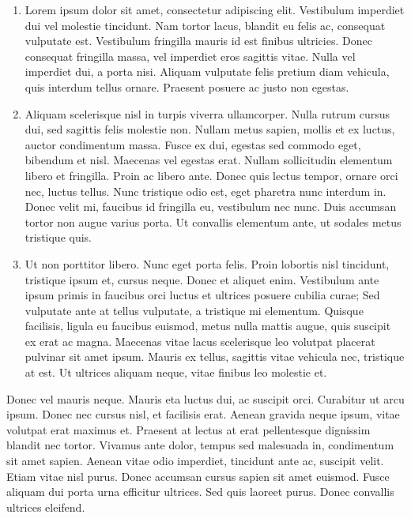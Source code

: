 \documentclass[DoubleHeader, Abgabe]{../abgaben}
\begin{document}
		
	
	\begin{enumerate}
		\item  Lorem ipsum dolor sit amet, consectetur adipiscing elit. Vestibulum imperdiet dui vel molestie tincidunt. Nam tortor lacus, blandit eu felis ac, consequat vulputate est. Vestibulum fringilla mauris id est finibus ultricies. Donec consequat fringilla massa, vel imperdiet eros sagittis vitae. Nulla vel imperdiet dui, a porta nisi. Aliquam vulputate felis pretium diam vehicula, quis interdum tellus ornare. Praesent posuere ac justo non egestas. 
		\item  Aliquam scelerisque nisl in turpis viverra ullamcorper. Nulla rutrum cursus dui, sed sagittis felis molestie non. Nullam metus sapien, mollis et ex luctus, auctor condimentum massa. Fusce ex dui, egestas sed commodo eget, bibendum et nisl. Maecenas vel egestas erat. Nullam sollicitudin elementum libero et fringilla. Proin ac libero ante. Donec quis lectus tempor, ornare orci nec, luctus tellus. Nunc tristique odio est, eget pharetra nunc interdum in. Donec velit mi, faucibus id fringilla eu, vestibulum nec nunc. Duis accumsan tortor non augue varius porta. Ut convallis elementum ante, ut sodales metus tristique quis. 
		\item  Ut non porttitor libero. Nunc eget porta felis. Proin lobortis nisl tincidunt, tristique ipsum et, cursus neque. Donec et aliquet enim. Vestibulum ante ipsum primis in faucibus orci luctus et ultrices posuere cubilia curae; Sed vulputate ante at tellus vulputate, a tristique mi elementum. Quisque facilisis, ligula eu faucibus euismod, metus nulla mattis augue, quis suscipit ex erat ac magna. Maecenas vitae lacus scelerisque leo volutpat placerat pulvinar sit amet ipsum. Mauris ex tellus, sagittis vitae vehicula nec, tristique at est. Ut ultrices aliquam neque, vitae finibus leo molestie et. 
	\end{enumerate}
	Donec vel mauris neque. Mauris eta luctus dui, ac suscipit orci. Curabitur ut arcu ipsum. Donec nec cursus nisl, et facilisis erat. Aenean gravida neque ipsum, vitae volutpat erat maximus et. Praesent at lectus at erat pellentesque dignissim blandit nec tortor. Vivamus ante dolor, tempus sed malesuada in, condimentum sit amet sapien. Aenean vitae odio imperdiet, tincidunt ante ac, suscipit velit. Etiam vitae nisl purus. Donec accumsan cursus sapien sit amet euismod. Fusce aliquam dui porta urna efficitur ultrices. Sed quis laoreet purus. Donec convallis ultrices eleifend. 	
	\begin{solution}
		
	\end{solution}
\end{document}
